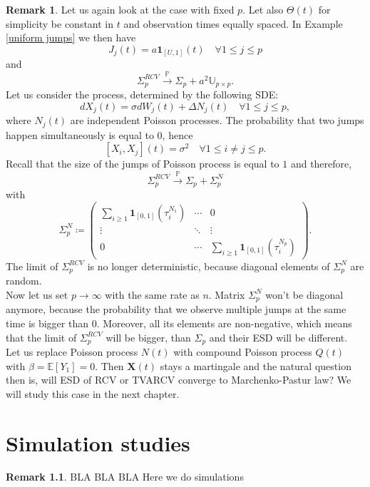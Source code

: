 \documentclass[a4paper,11pt]{book}
\theoremstyle{plain}
\theoremstyle{definition}
\newtheorem{rmrk}[thm]{Remark}
\newcommand{\ME}{\mathbb{E}}
\newcommand{\MP}{\mathbb{P}}
\begin{document}
    \begin{rmrk}
    	Let us again look at the case with fixed $p$. Let also $\Theta(t)$ for simplicity be constant in $t$ and observation times equally spaced. In Example \ref{uniform jumps} we then have
    	\[J_j(t) = a\mathbf{1}_{[U, 1]}(t) \quad \forall 1 \leq j \leq p \]
    	and
    	\[ \Sigma_p^{RCV} \xrightarrow{\MP} \Sigma_p + a^2\mathbb{U}_{p \times p}.  \]    	
    	Let us consider the process, determined by the following SDE:
    	\[ dX_j(t) = \sigma dW_j(t) + \Delta N_j(t) \quad \forall 1 \leq j \leq p, \]
    	where $N_j(t)$ are independent Poisson processes. The probability that two jumps happen simultaneously is equal to $0$, hence
    	\[ [X_i, X_j](t) = \sigma^2 \quad \forall 1 \leq i \neq j \leq p. \]
    	Recall that the size of the jumps of Poisson process is equal to $1$ and therefore,
    	\[ \Sigma_p^{RCV} \xrightarrow{\MP} \Sigma_p + \Sigma_p^N\]
    	with
    	\[
    	 \Sigma_p^N \coloneqq \begin{pmatrix}
    	\sum_{i \geq 1} \mathbf{1}_{[0, 1]} (\tau_i^{N_1}) & \cdots & 0 \\
    	\vdots & \ddots & \vdots \\
    	0 & \cdots & \sum_{i \geq 1} \mathbf{1}_{[0, 1]} (\tau_i^{N_p})
    	\end{pmatrix}
    	. \]
    	The limit of $\Sigma_p^{RCV}$ is no longer deterministic, because diagonal elements of $\Sigma_p^N$ are random. \\
    	Now let us set $p \rightarrow \infty$ with the same rate as $n$. Matrix $\Sigma_p^N$ won't be diagonal anymore, because the probability that we observe multiple jumps at the same time is bigger than $0$. Moreover, all its elements are non-negative, which means that the limit of $\Sigma_p^{RCV}$ will be bigger, than $\Sigma_p$ and their ESD will be different. Let us replace Poisson process $N(t)$ with compound Poisson process $Q(t)$ with $\beta = \ME[Y_1] = 0$. Then $\mathbf{X}(t)$ stays a martingale and the natural question then is, will ESD of RCV or TVARCV converge to Marchenko-Pastur law? We will study this case in the next chapter.
    \end{rmrk}
    
    \chapter{Simulation studies}
    
    \begin{rmrk}
    	BLA BLA BLA Here we do simulations
    \end{rmrk}
    
\end{document}
